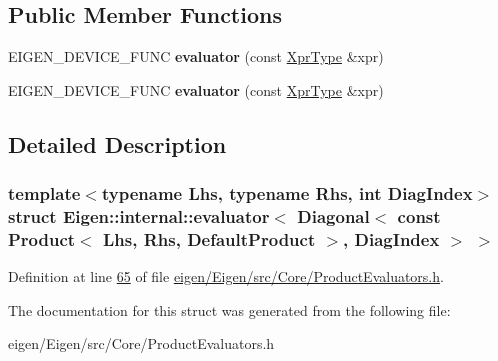 \subsection*{Public Member Functions}
\begin{DoxyCompactItemize}
\item 
\mbox{\label{struct_eigen_1_1internal_1_1evaluator_3_01_diagonal_3_01const_01_product_3_01_lhs_00_01_rhs_00_0f2daf8d0d705abfd9eae463424f3e8d5_a6abc0898ed75deff9f554cc9eab59578}} 
E\+I\+G\+E\+N\+\_\+\+D\+E\+V\+I\+C\+E\+\_\+\+F\+U\+NC {\bfseries evaluator} (const \hyperlink{group___core___module_class_eigen_1_1_diagonal}{Xpr\+Type} \&xpr)
\item 
\mbox{\label{struct_eigen_1_1internal_1_1evaluator_3_01_diagonal_3_01const_01_product_3_01_lhs_00_01_rhs_00_0f2daf8d0d705abfd9eae463424f3e8d5_a6abc0898ed75deff9f554cc9eab59578}} 
E\+I\+G\+E\+N\+\_\+\+D\+E\+V\+I\+C\+E\+\_\+\+F\+U\+NC {\bfseries evaluator} (const \hyperlink{group___core___module_class_eigen_1_1_diagonal}{Xpr\+Type} \&xpr)
\end{DoxyCompactItemize}


\subsection{Detailed Description}
\subsubsection*{template$<$typename Lhs, typename Rhs, int Diag\+Index$>$\newline
struct Eigen\+::internal\+::evaluator$<$ Diagonal$<$ const Product$<$ Lhs, Rhs, Default\+Product $>$, Diag\+Index $>$ $>$}



Definition at line \hyperlink{eigen_2_eigen_2src_2_core_2_product_evaluators_8h_source_l00065}{65} of file \hyperlink{eigen_2_eigen_2src_2_core_2_product_evaluators_8h_source}{eigen/\+Eigen/src/\+Core/\+Product\+Evaluators.\+h}.



The documentation for this struct was generated from the following file\+:\begin{DoxyCompactItemize}
\item 
eigen/\+Eigen/src/\+Core/\+Product\+Evaluators.\+h\end{DoxyCompactItemize}
